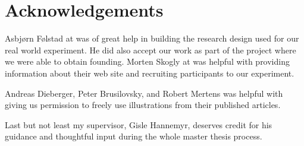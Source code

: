\chapter{Acknowledgements}

Asbj\o{}rn F\o{}lstad at  was of great help in building the
research design used for our real world experiment.
He did also accept our work as part of the  project where we
were able to obtain founding.
Morten Skogly at  \urort{} was helpful with providing information
about their web site and recruiting participants to our experiment.

Andreas Dieberger, Peter Brusilovsky, and Robert Mertens was helpful with
giving us permission to freely use illustrations from their
published articles.

Last but not least my supervisor, Gisle Hannemyr, deserves credit for
his guidance and thoughtful input during the whole master thesis process.
